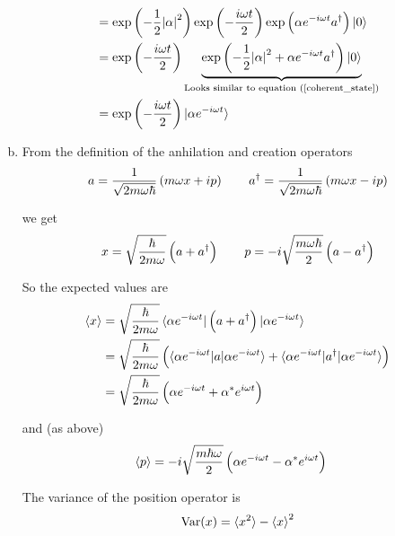 \documentclass[a4paper,german,12pt,smallheadings]{scrartcl}
\begin{document}
\begin{enumerate}[a)]
\begin{align*}
      &= \exp\del{-\frac{1}{2}  \envert{\alpha}^2}  \exp\del{-\frac{i \omega t}{2}} \exp \del{\alpha e^{-i \omega t} a^\dagger} \ket{0} \\
      &= \exp\del{-\frac{i \omega t}{2}} \underbrace{\exp\del{-\frac{1}{2}  \envert{\alpha}^2  + \alpha e^{-i \omega t} a^\dagger} \ket{0}}_{\text{Looks similar to equation (\ref{coherent_state})}} \\
      &= \exp\del{-\frac{i \omega t}{2}} \ket{\alpha e^{-i \omega t}}
    \end{align*}
  \item
    From the definition of the anhilation and creation operators
    \begin{equation*}
      a = \frac{1}{\sqrt{2 m \omega \hbar}} \del{m \omega x + ip} \qquad
      a^\dagger = \frac{1}{\sqrt{2 m \omega \hbar}} \del{m \omega x - ip}
    \end{equation*}

    we get
    \begin{equation*}
      x = \sqrt{\frac{\hbar}{2 m \omega}} \del{a + a^\dagger} \qquad
      p = -i\sqrt{\frac{m \omega \hbar}{2}} \del{a - a^\dagger}
    \end{equation*}

    So the expected values are
    \begin{align*}
      \braket{x} &= \sqrt{\frac{\hbar}{2 m \omega}} \braket{\alpha e^{-i \omega t}|\del{a + a^\dagger}|\alpha e^{-i \omega t}} \\
                 &= \sqrt{\frac{\hbar}{2 m \omega}} \del{ \braket{\alpha e^{-i \omega t}|a|\alpha e^{-i \omega t}} +
                                                          \braket{\alpha e^{-i \omega t}|a^\dagger|\alpha e^{-i \omega t}}} \\
                 &= \sqrt{\frac{\hbar}{2 m \omega}} \del{ \alpha e^{-i \omega t} + \alpha^* e^{i \omega t}} \\
    \end{align*}

    and (as above)
    \begin{align*}
      \braket{p} &= -i\sqrt{\frac{m \hbar \omega}{2}} \del{\alpha e^{-i \omega t} - \alpha^* e^{i \omega t}}
    \end{align*}

    The variance of the position operator is
    \begin{equation*}
      \operatorname{Var}(x) = \braket{x^2} - \braket{x}^2
    \end{equation*}


\end{enumerate}
\end{document}
